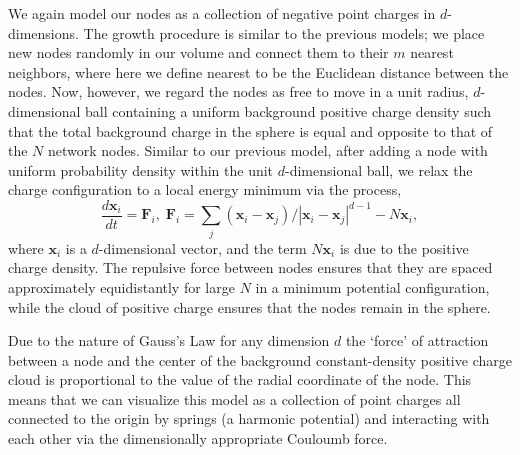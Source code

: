 \documentclass[aps,pre,manuscript,superscriptaddress,amsmath,amssymb,nofootinbib]{revtex4-1}
\begin{document}
We again model our nodes as a collection of negative point charges in $d$-dimensions.
The growth procedure is similar to the previous models; we place new nodes randomly in our volume and connect them to their $m$ nearest neighbors, where here we define nearest to be the Euclidean distance between the nodes.
Now, however, we regard the nodes as free to move in a unit radius, $d$-dimensional ball containing a uniform background positive charge density such that the total background charge in the sphere is equal and opposite to that of the $N$ network nodes.
Similar to our previous model, after adding a node with uniform probability density within the unit $d$-dimensional ball, we relax the charge configuration to a local energy minimum via the process,
\begin{equation}
\frac{d\textbf{x}_i}{dt} = \textbf{F}_i,\;
\textbf{F}_i = \sum_{j} (\textbf{x}_i - \textbf{x}_j)/|\textbf{x}_i-\textbf{x}_j|^{d-1} - N\textbf{x}_i,
\end{equation}
where $\textbf{x}_i$ is a $d$-dimensional vector, and the term $N\textbf{x}_i$ is due to the positive charge density.
The repulsive force between nodes ensures that they are spaced approximately equidistantly for large $N$ in a minimum potential configuration, while the cloud of positive charge ensures that the nodes remain in the sphere.

Due to the nature of Gauss's Law for any dimension $d$ the `force' of attraction between a node and the center of the background constant-density positive charge cloud is proportional to the value of the radial coordinate of the node.
This means that we can visualize this model as a collection of point charges all connected to the origin by springs (a harmonic potential) and interacting with each other via the dimensionally appropriate Couloumb force.  
\end{document}
